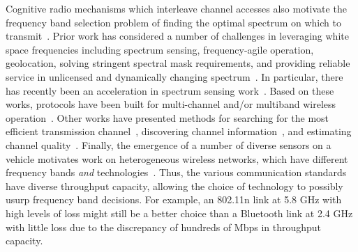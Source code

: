 Cognitive radio mechanisms which interleave channel accesses also motivate the frequency
band selection problem of finding the optimal spectrum on which to 
transmit~\cite{ghasemi2008spectrum}.
Prior work has considered a number of challenges in
leveraging white space frequencies including spectrum sensing, frequency-agile operation,
geolocation, solving stringent spectral mask requirements, and providing reliable service
in unlicensed and dynamically changing spectrum~\cite{shellhammer2009technical}. In particular, there has recently been an acceleration
in spectrum sensing work~\cite{rayanchu2011fluid, kim1996pulse,cabric2004implementation}. Based on 
these works, protocols have been built for multi-channel and/or multiband wireless operation~\cite{MOAR,
raychaudhuri2003spectrum,sabharwal2007opportunistic}.  Other works have presented methods for searching for the most efficient 
transmission channel~\cite{mo2005comparison}, discovering channel information~\cite{rayanchu2011fluid, sabharwal2007opportunistic}, and estimating 
channel quality~\cite{MOAR}.
Finally, the emergence of a number of diverse sensors on a vehicle motivates work
on heterogeneous wireless networks, which have different frequency bands {\it and}
technologies~\cite{hossain2010vehicular}. Thus, the various communication 
standards have diverse throughput capacity, allowing the choice of technology 
to possibly usurp frequency band decisions. For example, an 802.11n link at 5.8 
GHz with high levels of loss
might still be a better choice than a Bluetooth link at 2.4 GHz with little loss
due to the discrepancy of hundreds of Mbps in throughput capacity.

